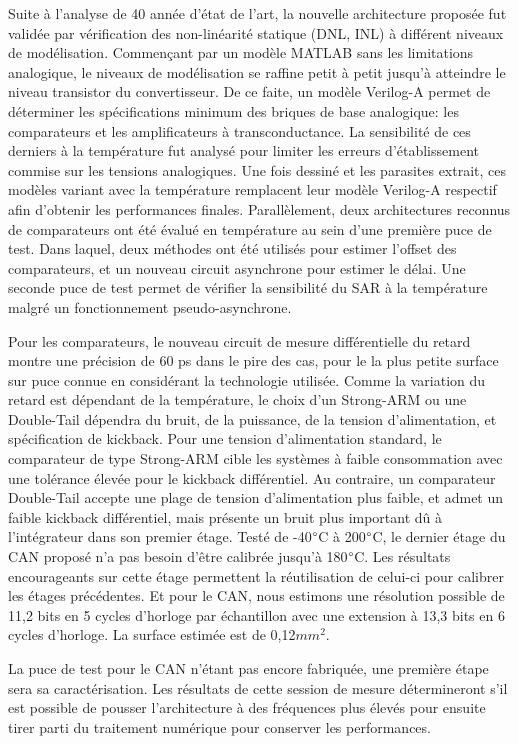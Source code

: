 \begin{mdframed}[linecolor=Prune,linewidth=1]
\begin{small}
\begin{multicols}{2}
Suite à l'analyse de 40 année d'état de l'art, la nouvelle architecture proposée fut validée par vérification des non-linéarité statique (DNL, INL) à différent niveaux de modélisation. Commençant par un modèle MATLAB sans les limitations analogique, le niveaux de modélisation se raffine petit à petit jusqu'à atteindre le niveau transistor du convertisseur. De ce faite, un modèle Verilog-A permet de déterminer les spécifications minimum des briques de base analogique: les comparateurs et les amplificateurs à transconductance. La sensibilité de ces derniers à la température fut analysé pour limiter les erreurs d'établissement commise sur les tensions analogiques. Une fois dessiné et les parasites extrait, ces modèles variant avec la température remplacent leur modèle Verilog-A respectif afin d'obtenir les performances finales. Parallèlement, deux architectures reconnus de comparateurs ont été évalué en température au sein d'une première puce de test. Dans laquel, deux méthodes ont été utilisés pour estimer l'offset des comparateurs, et un nouveau circuit asynchrone pour estimer le délai. Une seconde puce de test permet de vérifier la sensibilité du SAR à la température malgré un fonctionnement pseudo-asynchrone.

Pour les comparateurs, le nouveau circuit de mesure différentielle du retard montre une précision de 60 ps dans le pire des cas, pour le la plus petite surface sur puce connue en considérant la technologie utilisée. Comme la variation du retard est dépendant de la température, le choix d'un Strong-ARM ou une Double-Tail dépendra du bruit, de la puissance, de la tension d'alimentation, et spécification de kickback. Pour une tension d'alimentation standard, le comparateur de type Strong-ARM cible les systèmes à faible consommation avec une tolérance élevée pour le kickback différentiel. Au contraire, un comparateur Double-Tail accepte une plage de tension d'alimentation plus faible, et admet un faible kickback différentiel, mais présente un bruit plus important dû à l'intégrateur dans son premier étage. Testé de -40\(\degree \)C à 200\(\degree \)C, le dernier étage du CAN proposé n'a pas besoin d'être calibrée jusqu'à 180\(\degree \)C. Les résultats encourageants sur cette étage permettent la réutilisation de celui-ci pour calibrer les étages précédentes. Et pour le CAN, nous estimons une résolution possible de 11,2 bits en 5 cycles d'horloge par échantillon avec une extension à 13,3 bits en 6 cycles d'horloge. La surface estimée est de 0,12$mm^2$.

La puce de test pour le CAN n'étant pas encore fabriquée, une première étape sera sa caractérisation. Les résultats de cette session de mesure détermineront s'il est possible de pousser l'architecture à des fréquences plus élevés pour ensuite tirer parti du traitement numérique pour conserver les performances.
\end{multicols}
\end{small}
\end{mdframed}
